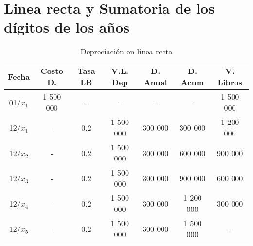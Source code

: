 \documentclass[10pt,a4paper]{report}
\begin{document}
\section{Linea recta y Sumatoria de los dígitos de los años}	
	\begin{table}[h]
	\centering
	\caption{Depreciación en linea recta}	
	
	\begin{tabular}{|c|c|c|c|c|c|c|} \hline
	
	Fecha    & Costo D.  & Tasa LR & V.L. Dep  & D. Anual & D. Acum   & V. Libros \\ \hline

	01/$x_1$ & 1 500 000 & -       & -         & -        & -         & 1 500 000 \\ \hline

	12/$x_1$ & -         & 0.2     & 1 500 000 & 300 000  & 300 000   & 1 200 000 \\ \hline

	12/$x_2$ & -         & 0.2     & 1 500 000 & 300 000  & 600 000   & 900 000   \\ \hline

	12/$x_3$ & -         & 0.2     & 1 500 000 & 300 000  & 900 000   & 600 000   \\ \hline

	12/$x_4$ & -         & 0.2     & 1 500 000 & 300 000  & 1 200 000 & 300 000   \\ \hline

	12/$x_5$ & -         & 0.2     & 1 500 000 & 300 000  & 1 500 000 & -         \\ \hline

	\end{tabular}
	\end{table}
\end{document}
